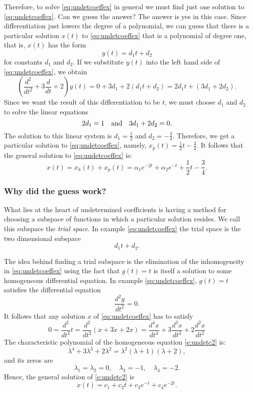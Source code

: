 \documentclass{ximera}
\begin{document}
Therefore, to solve \eqref{eq:undetcoeffex} in general we must find just one 
solution to \eqref{eq:undetcoeffex}.  Can we guess the answer?  The answer is
yes in this case.  Since differentiation just lowers the degree of a 
polynomial, we can guess that there is a particular solution $x(t)$ to 
\eqref{eq:undetcoeffex} that is a polynomial of degree one, that is, $x(t)$ 
has the form 
\[
y(t)=d_1t+d_2
\]
for constants $d_1$ and $d_2$.  If we substitute $y(t)$ 
into the left hand side of \eqref{eq:undetcoeffex}, we obtain
\[
\left(\frac{d^2}{dt^2}+3\frac{d}{dt}+2\right)y(t) = 
0+3d_1+2(d_1t+d_2) = 2d_1t + (3d_1+2d_2).
\]
Since we want the result of this differentiation to be $t$, we must choose 
$d_1$ and $d_2$ to solve the linear equations
\[
2d_1 = 1 \quad\mbox{and}\quad 3d_1+2d_2=0.
\]
The solution to this linear system is $d_1=\frac{1}{2}$ and 
$d_2=-\frac{3}{4}$.   Therefore, we get a 
particular solution to 
\eqref{eq:undetcoeffex}, namely, $x_p(t)=\frac{1}{2}t-\frac{3}{4}$.  
It follows that the general solution to \eqref{eq:undetcoeffex} is:
\[
x(t) = x_h(t)+x_p(t) = \alpha_1e^{-2t} + \alpha_2e^{-t} + 
\frac{1}{2}t-\frac{3}{4}.
\]

\subsubsection*{Why did the guess work?}

What lies at the heart of undetermined coefficients is having a method 
for choosing a subspace of functions in which a particular solution resides.  
We call this subspace the {\em trial space}.  In example 
\eqref{eq:undetcoeffex} the trial space is the two dimensional subspace
\[
d_1t + d_2.
\]

The idea behind finding a trial subspace is the elimination of the 
inhomogeneity in \eqref{eq:undetcoeffex} using the fact that $g(t)=t$ is 
itself a solution to some homogeneous differential equation.  In example 
\eqref{eq:undetcoeffex}, $g(t)=t$ satisfies the differential equation
\[
\frac{d^2y}{dt^2} = 0.
\]
It follows that any solution $x$ of \eqref{eq:undetcoeffex} has to satisfy
\begin{equation}  \label{e:undetc2}
0 = \frac{d^2}{dt^2}t=\frac{d^2}{dt^2}(\ddot{x} + 3\dot{x}+2x) = 
\frac{d^4x}{dt^4} + 3\frac{d^3x}{dt^3} + 2\frac{d^2x}{dt^2}
\end{equation}
The characteristic 
polynomial
of the homogeneous equation 
\eqref{e:undetc2} is: 
\[
\lambda^4 + 3\lambda^3 + 2\lambda^2 = \lambda^2(\lambda+1)(\lambda+2),
\]
and its zeros are
\[
\lambda_1=\lambda_2=0,\quad \lambda_3=-1,\quad \lambda_4 = -2.
\]
Hence, the general solution of \eqref{e:undetc2} is
\[
x(t) = c_1 + c_2 t + c_3 e^{-t} + c_4 e^{-2t}.
\]
\end{document}
